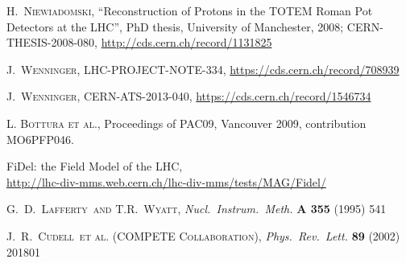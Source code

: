 \documentclass[3p,onecolumn,12pt,times,longtitle]{elsarticle}
\def\etal{et al.}
\def\Name#1{\textsc{#1}, }
\def\REVIEW#1#2#3#4{{\it #1} {\bf #2} (#3) #4}
\begin{document}
\begin{thebibliography}{99}
	\Name{H.~Niewiadomski}
	``Reconstruction of Protons in the TOTEM Roman Pot Detectors at the LHC'',
    PhD thesis, University of Manchester, 2008;
    CERN-THESIS-2008-080,
	\url{http://cds.cern.ch/record/1131825}

	\Name{J.~Wenninger}
	LHC-PROJECT-NOTE-334,
	\url{https://cds.cern.ch/record/708939}


	\Name{J.~Wenninger}
	CERN-ATS-2013-040,
	\url{https://cds.cern.ch/record/1546734}

        \Name{L. Bottura et al.}
        Proceedings of PAC09, Vancouver 2009, contribution MO6PFP046.

	FiDel: the Field Model of the LHC,\\
	\url{http://lhc-div-mms.web.cern.ch/lhc-div-mms/tests/MAG/Fidel/}

	\Name{G.~D.~Lafferty~and T.R.~Wyatt}
	\REVIEW{Nucl.\ Instrum.\ Meth.}{A 355}{1995}{541}

	\Name{J.~R.~Cudell~\etal{} (COMPETE Collaboration)}
	\REVIEW{Phys.\ Rev.\ Lett.}{89}{2002}{201801}

\end{thebibliography}
\end{document}
